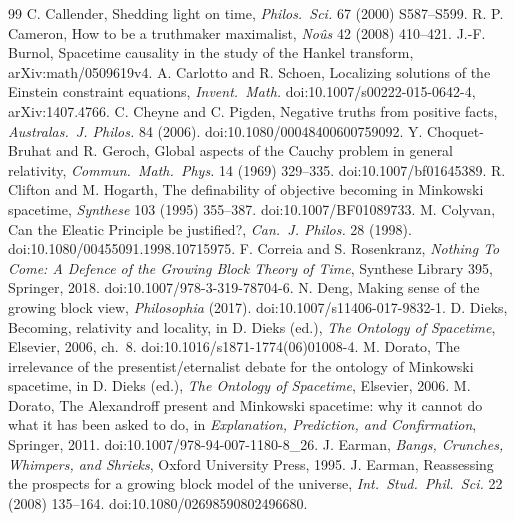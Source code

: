 \documentclass[11pt]{article}
\theoremstyle{definition}
\begin{document}
\begin{thebibliography}{99}
 C. Callender, Shedding light on time, \emph{Philos.\ Sci.} 67 (2000) S587--S599.
 R. P. Cameron, How to be a truthmaker maximalist, \emph{Noûs} 42 (2008) 410--421.
 J.-F. Burnol, Spacetime causality in the study of the Hankel transform, arXiv:math/0509619v4.
 A. Carlotto and R. Schoen, Localizing solutions of the Einstein constraint equations, \emph{Invent.\ Math.} doi:10.1007/s00222-015-0642-4, arXiv:1407.4766.
 C. Cheyne and C. Pigden, Negative truths from positive facts, \emph{Australas.\ J. Philos.} 84 (2006). doi:10.1080/00048400600759092.
 Y. Choquet-Bruhat and R. Geroch, Global aspects of the Cauchy problem in general relativity, \emph{Commun.\ Math.\ Phys.} 14 (1969) 329--335. doi:10.1007/bf01645389.
 R. Clifton and M. Hogarth, The definability of objective becoming in Minkowski spacetime, \emph{Synthese} 103 (1995) 355--387. doi:10.1007/BF01089733.
 M. Colyvan, Can the Eleatic Principle be justified?, \emph{Can.\ J. Philos.} 28 (1998). doi:10.1080/00455091.1998.10715975.
 F. Correia and S. Rosenkranz, \emph{Nothing To Come: A Defence of the Growing Block Theory of Time}, Synthese Library 395, Springer, 2018. doi:10.1007/978-3-319-78704-6.
 N. Deng, Making sense of the growing block view, \emph{Philosophia} (2017). doi:10.1007/s11406-017-9832-1.
 D. Dieks, Becoming, relativity and locality, in D. Dieks (ed.), \emph{The Ontology of Spacetime}, Elsevier, 2006, ch.~8. doi:10.1016/s1871-1774(06)01008-4.
 M. Dorato, The irrelevance of the presentist/eternalist debate for the ontology of Minkowski spacetime, in D. Dieks (ed.), \emph{The Ontology of Spacetime}, Elsevier, 2006.
 M. Dorato, The Alexandroff present and Minkowski spacetime: why it cannot do what it has been asked to do, in \emph{Explanation, Prediction, and Confirmation}, Springer, 2011. doi:10.1007/978-94-007-1180-8\_26.
 J. Earman, \emph{Bangs, Crunches, Whimpers, and Shrieks}, Oxford University Press, 1995.
 J. Earman, Reassessing the prospects for a growing block model of the universe, \emph{Int.\ Stud.\ Phil.\ Sci.} 22 (2008) 135--164. doi:10.1080/02698590802496680.

\end{thebibliography}
\end{document}

